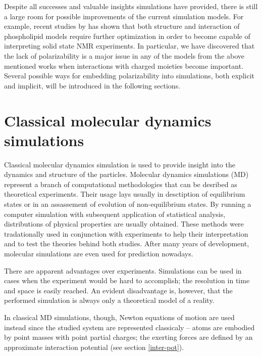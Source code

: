 Despite all successes and valuable insights simulations have provided, 
there is still a large room for possible improvements of the current simulation models. 
For example, recent studies by \citet{botan15, catte16} has shown 
that both structure and interaction of phospholipid models require further optimization 
in order to become capable of interpreting solid state NMR experiments. 
In particular, we have discovered that 
the lack of polarizability is a major issue in any of the models 
from the above mentioned works \citep{botan15, catte16}
when interactions with charged moieties become important. 
Several possible ways for embedding polarizability into simulations, both explicit and implicit, 
will be introduced in the following sections. 





\section{Classical molecular dynamics simulations}
\label{section:md}

Classical molecular dynamics simulation is used to provide insight into the dynamics and structure of the particles. 
  Molecular dynamics simulations (MD) represent a branch of computational methodologies that can be desribed as theoretical experiments. 
  Their usage lays usually in desctiption of equilibrium states or in an assassement of evolution of non-equilibrium states.
  By running a computer simulation with subsequent application of statistical analysis, distributions of physical properties are usually obtained. 
  These methods were tradationally used in conjunction with experiments to help their interpretation and to test the theories behind both studies. After many years of development, molecular simulations are even used for prediction nowadays.

  There are apparent advantages over experiments. Simulations can be used in cases when the experiment would be hard to accomplish; the resolution in time and space is easily reached. An evident disadvantage is, however, that the performed simulation is always only a theoretical model of a reality. 


In classical MD simulations, though, Newton equations of motion are used instead since the studied system are represented classicaly -- atoms are embodied by point masses with point partial charges; the exerting forces are defined by an approximate interaction potential (see section \ref{inter-pot}). 


